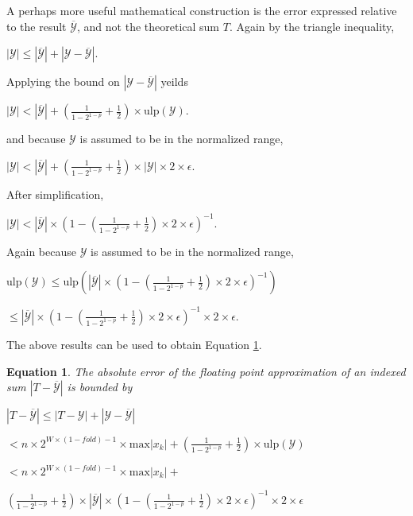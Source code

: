 \documentclass[12pt]{article}
\providecommand{\max}{\ensuremath{\text{max}}}
\providecommand{\ulp}{\ensuremath{\text{ulp}}}
\theoremstyle{plain}
\newtheorem{eq}{Equation}[section]
\begin{document}
    A perhaps more useful mathematical construction is the error expressed relative to the result $\overline{\mathcal{Y}}$, and not the theoretical sum $T$. Again by the triangle inequality,

    $|\mathcal{Y}| \leq |\overline{\mathcal{Y}}| + |\mathcal{Y} - \overline{\mathcal{Y}}|$.

    Applying the bound on $|\mathcal{Y} - \overline{\mathcal{Y}}|$ yeilds

    $|\mathcal{Y}| < |\overline{\mathcal{Y}}| + (\frac{1}{1 - 2^{1 - p}} + \frac{1}{2})\times \ulp(\mathcal{Y})$.

    and because $\mathcal{Y}$ is assumed to be in the normalized range,

    $|\mathcal{Y}| < |\overline{\mathcal{Y}}| + (\frac{1}{1 - 2^{1 - p}} + \frac{1}{2})\times|\mathcal{Y}|\times 2 \times \epsilon$.

    After simplification,

    $|\mathcal{Y}| < |\overline{\mathcal{Y}}|\times (1 - (\frac{1}{1 - 2^{1 - p}} + \frac{1}{2})\times 2 \times \epsilon)^{-1}$.

    Again because $\mathcal{Y}$ is assumed to be in the normalized range,

    $\ulp(\mathcal{Y}) \leq \ulp(|\overline{\mathcal{Y}}|\times (1 - (\frac{1}{1 - 2^{1 - p}} + \frac{1}{2})\times 2 \times \epsilon)^{-1})$

    \indent \indent$\leq |\overline{\mathcal{Y}}|\times (1 - (\frac{1}{1 - 2^{1 - p}} + \frac{1}{2})\times 2 \times \epsilon)^{-1} \times 2 \times \epsilon$.

    The above results can be used to obtain Equation \ref{eq:error2}.

    \begin{eq} The absolute error of the floating point approximation of an indexed sum $|T - \overline{\mathcal{Y}}|$ is bounded by

      $|T - \overline{\mathcal{Y}}| \leq |T - \mathcal{Y}| + |\mathcal{Y} - \overline{\mathcal{Y}}|$

      \indent\indent$< n \times 2^{W \times (1 - fold) - 1} \times \max|x_k| + (\frac{1}{1 - 2^{1 - p}} + \frac{1}{2})\times \ulp(\mathcal{Y})$

      \indent\indent$< n \times 2^{W \times (1 - fold) - 1} \times \max|x_k| + $

      \indent\indent \indent$(\frac{1}{1 - 2^{1 - p}} + \frac{1}{2})\times|\overline{\mathcal{Y}}|\times (1 - (\frac{1}{1 - 2^{1 - p}} + \frac{1}{2})\times 2 \times \epsilon)^{-1} \times 2 \times \epsilon$
      \label{eq:error2}
    \end{eq}
\end{document}
